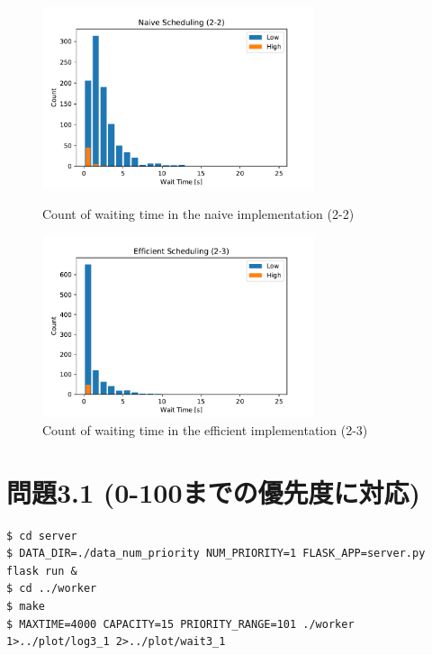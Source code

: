 \begin{figure}[htbp]
  \begin{minipage}[b]{0.40\hsize}
      \centering
      \includegraphics[width=8cm]{imgs/wait2_2.pdf}
      \caption{Count of waiting time in the naive implementation (2-2)}
      \label{fig:wait2_2}
  \end{minipage}
  \begin{minipage}{0.1\hsize}
    \hspace{0.05\hsize}
  \end{minipage}
  \begin{minipage}[b]{0.40\hsize}
      \centering
      \includegraphics[width=8cm]{imgs/wait2_3.pdf}
      \caption{Count of waiting time in the efficient implementation (2-3)}
      \label{fig:wait2_3}
  \end{minipage}
\end{figure}

\clearpage
\section*{問題3.1 (0-100までの優先度に対応)}

\begin{lstlisting}[]
$ cd server
$ DATA_DIR=./data_num_priority NUM_PRIORITY=1 FLASK_APP=server.py flask run &
$ cd ../worker
$ make
$ MAXTIME=4000 CAPACITY=15 PRIORITY_RANGE=101 ./worker 1>../plot/log3_1 2>../plot/wait3_1
\end{lstlisting}

